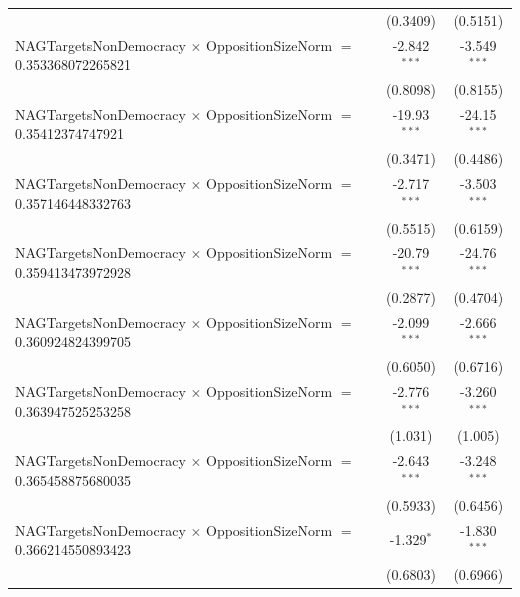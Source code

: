 \begin{tabular}{lcc}
                                                                                & (0.3409)             & (0.5151)\\   
   NAGTargetsNonDemocracy $\times$ OppositionSizeNorm $=$ 0.353368072265821     & -2.842$^{***}$       & -3.549$^{***}$\\   
                                                                                & (0.8098)             & (0.8155)\\   
   NAGTargetsNonDemocracy $\times$ OppositionSizeNorm $=$ 0.35412374747921      & -19.93$^{***}$       & -24.15$^{***}$\\   
                                                                                & (0.3471)             & (0.4486)\\   
   NAGTargetsNonDemocracy $\times$ OppositionSizeNorm $=$ 0.357146448332763     & -2.717$^{***}$       & -3.503$^{***}$\\   
                                                                                & (0.5515)             & (0.6159)\\   
   NAGTargetsNonDemocracy $\times$ OppositionSizeNorm $=$ 0.359413473972928     & -20.79$^{***}$       & -24.76$^{***}$\\   
                                                                                & (0.2877)             & (0.4704)\\   
   NAGTargetsNonDemocracy $\times$ OppositionSizeNorm $=$ 0.360924824399705     & -2.099$^{***}$       & -2.666$^{***}$\\   
                                                                                & (0.6050)             & (0.6716)\\   
   NAGTargetsNonDemocracy $\times$ OppositionSizeNorm $=$ 0.363947525253258     & -2.776$^{***}$       & -3.260$^{***}$\\   
                                                                                & (1.031)              & (1.005)\\   
   NAGTargetsNonDemocracy $\times$ OppositionSizeNorm $=$ 0.365458875680035     & -2.643$^{***}$       & -3.248$^{***}$\\   
                                                                                & (0.5933)             & (0.6456)\\   
   NAGTargetsNonDemocracy $\times$ OppositionSizeNorm $=$ 0.366214550893423     & -1.329$^{*}$         & -1.830$^{***}$\\   
                                                                                & (0.6803)             & (0.6966)\\   

\end{tabular}
